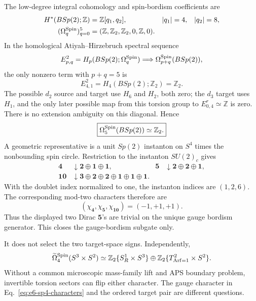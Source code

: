 \documentclass[11pt]{article}
\numberwithin{equation}{section}
\newcommand{\ZZ}{\mathbb Z}
\newcommand{\Arf}{\operatorname{Arf}}
\begin{document}
The low-degree integral cohomology and spin-bordism coefficients are
\begin{align}
 H^*(BSp(2);\ZZ)&=\ZZ[q_1,q_2],& |q_1|&=4,&|q_2|&=8,\nonumber\\
 (\Omega_q^{\rm Spin})_{q=0}^5
  &=(\ZZ,\ZZ_2,\ZZ_2,0,\ZZ,0).
 \label{eq:e6-bsp-input}
\end{align}
In the homological Atiyah--Hirzebruch spectral sequence
\begin{equation}
 E^2_{p,q}=H_p(BSp(2);\Omega_q^{\rm Spin})
 \Longrightarrow \Omega_{p+q}^{\rm Spin}(BSp(2)),
 \label{eq:e6-bsp-ahss}
\end{equation}
the only nonzero term with \(p+q=5\) is
\begin{equation}
 E^2_{4,1}=H_4(BSp(2);\ZZ_2)=\ZZ_2.
\end{equation}
The possible \(d_2\) source and target use \(H_6\) and \(H_2\), both zero;
the \(d_3\) target uses \(H_1\), and the only later possible map from this
torsion group to \(E^r_{0,4}\simeq\ZZ\) is zero.  There is no extension
ambiguity on this diagonal.  Hence
\begin{equation}
 \boxed{\Omega_5^{\rm Spin}(BSp(2))\simeq\ZZ_2.}
 \label{eq:e6-bsp-result}
\end{equation}
A geometric representative is a unit \(Sp(2)\) instanton on \(S^4\) times
the nonbounding spin circle.  Restriction to the instanton \(SU(2)_c\)
gives
\begin{align}
 \bm4&\downarrow \bm2\oplus\bm1\oplus\bm1,&
 \bm5&\downarrow \bm2\oplus\bm2\oplus\bm1,\nonumber\\
 \bm{10}&\downarrow \bm3\oplus\bm2\oplus\bm2
                   \oplus\bm1\oplus\bm1\oplus\bm1.
\end{align}
With the doublet index normalized to one, the instanton indices are
\((1,2,6)\).  The corresponding mod-two characters therefore are
\begin{equation}
 (\chi_{\bm4},\chi_{\bm5},\chi_{\bm{10}})=(-1,+1,+1).
 \label{eq:e6-sp4-characters}
\end{equation}
Thus the displayed two Dirac \(\bm5\)'s are trivial on the unique gauge
bordism generator.  This closes the gauge-bordism subgate only.

It does not select the two target-space signs.  Independently,
\begin{equation}
 \widetilde\Omega_4^{\rm Spin}(S^3\times S^2)
 \simeq \ZZ_2\{S^1_R\times S^3\}
 \oplus\ZZ_2\{T^2_{\Arf=1}\times S^2\}.
 \label{eq:e6-target-bordism}
\end{equation}
Without a common microscopic mass-family lift and APS boundary problem,
invertible torsion sectors can flip either character.  The gauge character
in Eq.~\eqref{eq:e6-sp4-characters} and the ordered target pair are different
questions.
\end{document}
